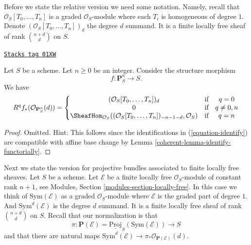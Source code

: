 Before we state the relative version we need some notation.
Namely, recall that $\mathcal{O}_S[T_0, \ldots, T_n]$ is a graded
$\mathcal{O}_S$-module where each $T_i$ is homogeneous of degree $1$.
Denote $(\mathcal{O}_S[T_0, \ldots, T_n])_d$ the degree $d$ summand.
It is a finite locally free sheaf of rank $\binom{n + d}{d}$ on $S$.

\begin{lemma}
\label{coherent-lemma-cohomology-projective-space-over-base}
\href{https://stacks.math.columbia.edu/tag/01XW}{\texttt{Stacks tag 01XW}}

Let $S$ be a scheme.
Let $n \geq 0$ be an integer.
Consider the structure morphism
$$
f : \mathbf{P}^n_S \longrightarrow S.
$$
We have
$$
R^qf_*(\mathcal{O}_{\mathbf{P}^n_S}(d)) =
\left\{
\begin{matrix}
(\mathcal{O}_S[T_0, \ldots, T_n])_d & \text{if} & q = 0 \\
0 & \text{if} & q \not = 0, n \\
\SheafHom_{\mathcal{O}_S}(
(\mathcal{O}_S[T_0, \ldots, T_n])_{- n - 1 - d}, \mathcal{O}_S)
& \text{if} & q = n
\end{matrix}
\right.
$$
\end{lemma}

\begin{proof}

Omitted. Hint: This follows since the identifications in
(\ref{equation-identify}) are compatible with affine base change
by Lemma \ref{coherent-lemma-identify-functorially}.
\end{proof}

Next we state the version for projective bundles associated to finite locally
free sheaves. Let $S$ be a scheme. Let $\mathcal{E}$ be a finite locally
free $\mathcal{O}_S$-module of constant rank $n + 1$, see
Modules, Section \ref{modules-section-locally-free}.
In this case we think of $\text{Sym}(\mathcal{E})$ as a graded
$\mathcal{O}_S$-module where $\mathcal{E}$ is the graded part of degree $1$.
And $\text{Sym}^d(\mathcal{E})$ is the degree $d$ summand.
It is a finite locally free sheaf of rank $\binom{n + d}{d}$ on $S$.
Recall that our normalization is that
$$
\pi :
\mathbf{P}(\mathcal{E})
=
\underline{\text{Proj}}_S(\text{Sym}(\mathcal{E}))
\longrightarrow
S
$$
and that there are natural maps
$\text{Sym}^d(\mathcal{E}) \to \pi_*\mathcal{O}_{\mathbf{P}(\mathcal{E})}(d)$.

